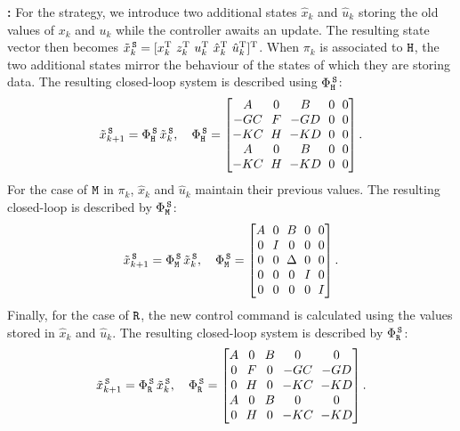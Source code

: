 \textbf{\tS{}: }%
%
For the \tS{} strategy, we introduce two additional states $\hat x_k$ and $\hat u_k$ storing the old values of $x_k$ and $u_k$ while the controller awaits an update.
The resulting state vector then becomes $\tilde x_k^{\,\texttt{S}} = [ x_k^{\mathrm{\small{T}}}{}\,\,z_k^{\mathrm{\small{T}}}{}\,\, u_k^{\mathrm{\small{T}}}{}\,\, \hat{x}_k^{\mathrm{\small{T}}}{}\,\, \hat{u}_k^{\mathrm{\small{T}}}{} ]^{\mathrm{\small{T}}}{}$.
When $\pi_k$ is associated to $\texttt{H}$, the two additional states mirror the behaviour of the states of which they are storing data.
The resulting closed-loop system is described using $\Phi{}^{\,\texttt{S}}_{\texttt{H}}$:
\begin{equation*}
    \setlength\arraycolsep{3pt}
    \tilde x_{k+1}^{\,\Skip} = \clmat{}^{\,\Skip}_{\cH}\,\tilde x_k^{\,\Skip}, \quad
    \clmat{}^{\,\Skip}_{\cH} = \begin{bmatrix}
        \Ap       & 0    & \Bp      & 0 & 0 \\
        -\Bc\Cp   & \Ac  & -\Bc\Dp  & 0 & 0 \\
        -\Dc\Cp   & \Cc  & -\Dc\Dp  & 0 & 0 \\
        \Ap       & 0    & \Bp      & 0 & 0 \\
        -\Dc\Cp   & \Cc  & -\Dc\Dp  & 0 & 0 \\
    \end{bmatrix}.
\end{equation*}
%
For the case of $\texttt{M}$ in $\pi_k$, $\hat x_k$ and $\hat u_k$ maintain their previous values. The
resulting closed-loop is described by $\Phi{}^{\,\texttt{S}}_{\texttt{M}}$:
%
\begin{equation*}
    \setlength\arraycolsep{3pt}
    \tilde x_{k+1}^{\,\Skip} = \clmat{}^{\,\Skip}_{\cM}\,\tilde x_k^{\,\Skip}, \quad
    \clmat{}^{\,\Skip}_{\cM}=\begin{bmatrix}
        \Ap & 0  & \Bp & 0 & 0 \\
        0   & I  & 0   & 0 & 0 \\
        0   & 0  & \Delta   & 0 & 0 \\
        0   & 0  & 0   & I & 0 \\
        0   & 0  & 0   & 0 & I \\
	\end{bmatrix}.
\end{equation*}
%
Finally, for the case of $\texttt{R}$, the new control command is calculated using the values stored in $\hat x_k$ and $\hat u_k$.
The resulting closed-loop system is described by $\Phi{}^{\,\texttt{S}}_{\texttt{R}}$:
%
\begin{equation*}
    \setlength\arraycolsep{3pt}
    \tilde x_{k+1}^{\,\Skip} = \clmat{}^{\,\Skip}_{\cR} \, \tilde x_{k}^{\,\Skip},\quad
    \clmat{}^{\,\Skip}_{\cR} = \begin{bmatrix}
        \Ap & 0    & \Bp & 0       & 0 \\
        0   & \Ac  & 0   & -\Bc\Cp & -\Bc\Dp \\
        0   & \Cc  & 0   & -\Dc\Cp & -\Dc\Dp \\
        \Ap & 0    & \Bp & 0       & 0 \\
        0   & \Cc  & 0   & -\Dc\Cp & -\Dc\Dp \\
    \end{bmatrix}.
\end{equation*}
